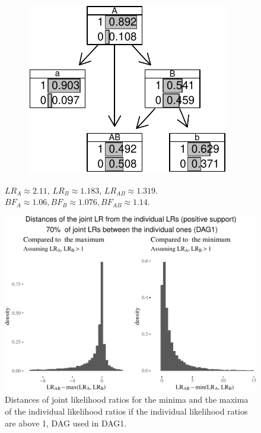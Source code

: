 \documentclass[
  10pt,
  dvipsnames,enabledeprecatedfontcommands]{scrartcl}
\begin{document}
\begin{figure}
\begin{subfigure}[!ht]{0.45\textwidth}
\begin{center}\includegraphics[width=1\linewidth]{conjunction-appendix14_files/figure-latex/unnamed-chunk-21-1} \end{center}
\end{subfigure}
\caption{$LR_A  \approx 2.11$, $LR_B \approx 1.183$,  $LR_{AB} \approx 1.319$. \newline  $BF_A \approx  1.06, BF_B \approx  1.076, BF_{AB}\approx   1.14$.}
\label{tab:CPTconjunctionBNL}
\end{figure}

\begin{figure}


\begin{center}\includegraphics[width=1\linewidth]{conjunction-appendix14_files/figure-latex/unnamed-chunk-22-1} \end{center}

\caption{Distances of joint likelihood ratios for the minima and the maxima of the individual likelihood ratios if the individual likelihood ratios are above 1, DAG used in \textsf{DAG1}.}
\label{fig:LRabovePlot}
\end{figure}
\end{document}
